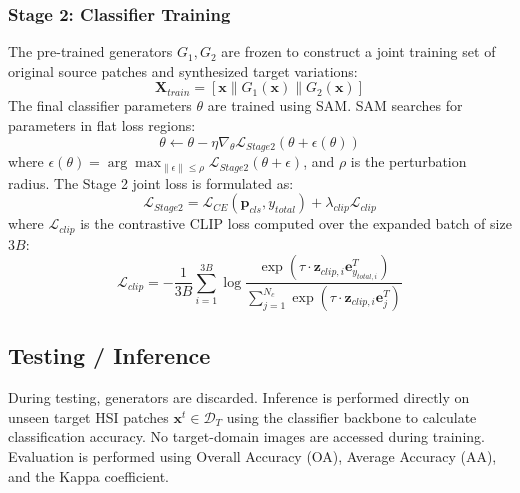 \subsubsection{Stage 2: Classifier Training}
The pre-trained generators $G_1, G_2$ are frozen to construct a joint training set of original source patches and synthesized target variations:
\begin{equation}
\mathbf{X}_{train} = \left[\mathbf{x} \parallel G_1(\mathbf{x}) \parallel G_2(\mathbf{x})\right]
\end{equation}
The final classifier parameters $\theta$ are trained using SAM. SAM searches for parameters in flat loss regions:
\begin{equation}
\theta \leftarrow \theta - \eta \nabla_{\theta} \mathcal{L}_{Stage2}(\theta + \epsilon(\theta))
\end{equation}
where $\epsilon(\theta) = \arg\max_{\|\epsilon\| \le \rho} \mathcal{L}_{Stage2}(\theta + \epsilon)$, and $\rho$ is the perturbation radius. The Stage 2 joint loss is formulated as:
\begin{equation}
\mathcal{L}_{Stage2} = \mathcal{L}_{CE}(\mathbf{p}_{cls}, y_{total}) + \lambda_{clip} \mathcal{L}_{clip}
\end{equation}
where $\mathcal{L}_{clip}$ is the contrastive CLIP loss computed over the expanded batch of size $3B$:
\begin{equation}
\mathcal{L}_{clip} = -\frac{1}{3B} \sum_{i=1}^{3B} \log \frac{\exp\left(\tau \cdot \mathbf{z}_{clip, i} \mathbf{e}_{y_{total, i}}^T\right)}{\sum_{j=1}^{N_c} \exp\left(\tau \cdot \mathbf{z}_{clip, i} \mathbf{e}_j^T\right)}
\end{equation}

\subsection{Testing / Inference}
During testing, generators are discarded. Inference is performed directly on unseen target HSI patches $\mathbf{x}^t \in \mathcal{D}_T$ using the classifier backbone to calculate classification accuracy. No target-domain images are accessed during training. Evaluation is performed using Overall Accuracy (OA), Average Accuracy (AA), and the Kappa coefficient.


